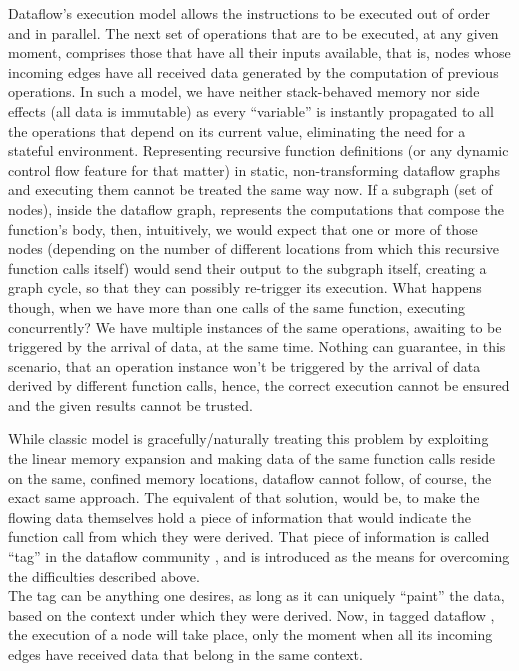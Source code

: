 \documentclass[ack,preface]{dithesis}
\begin{document}
Dataflow's execution model allows the instructions to be executed out of order and in parallel. The next set of operations that are to be executed, at any given moment, comprises those that have all their inputs available, that is, nodes whose incoming edges have all received data generated by the computation of previous operations. In such a model, we have neither stack-behaved memory nor side effects (all data is immutable) as every “variable” is instantly propagated to all the operations that depend on its current value, eliminating the need for a stateful environment.  Representing recursive function definitions (or any dynamic control flow feature for that matter) in static, non-transforming dataflow graphs and executing them cannot be treated the same way now.
If a subgraph (set of nodes), inside the dataflow graph, represents the computations that compose the function’s body, then, intuitively, we would expect that one or more of those nodes (depending on the number of different locations from which this recursive function calls itself) would send their output to the subgraph itself, creating a graph cycle, so that they can possibly re-trigger its execution. What happens though, when we have more than one calls of the same function, executing concurrently?  We have multiple instances of the same operations, awaiting to be triggered by the arrival of data, at the same time. Nothing can guarantee, in this scenario, that an operation instance won’t be triggered by the arrival of data derived by different function calls, hence, the correct execution cannot be ensured and the given results cannot be trusted.

While classic model is gracefully/naturally treating this problem by exploiting the linear memory expansion and making data of the same function calls reside on the same, confined memory locations, dataflow cannot follow, of course, the exact same approach. The equivalent of that solution, would be, to make the flowing data themselves hold a piece of information that would indicate the function call from which they were derived. That piece of information is called “tag” in the dataflow community \cite{Nikhil:2000}, and is introduced as the means for overcoming the difficulties described above.\\
 The tag can be anything one desires, as long as it can uniquely “paint” the data, based on the context under which they were derived. 
Now,  in tagged dataflow , the execution of a node will take place, only the moment when all its incoming edges have received data that belong in the same context.
    
\end{document}
